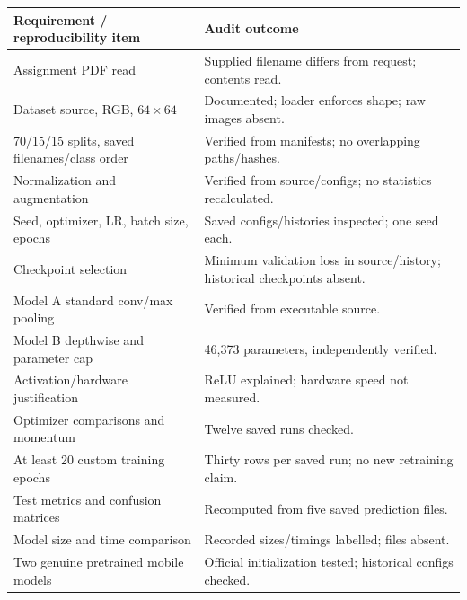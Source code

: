 \documentclass[11pt,a4paper]{article}
\begin{document}
\begin{longtable}{p{.58\linewidth}p{.34\linewidth}}\toprule

Requirement / reproducibility item & Audit outcome\\\midrule\endhead

Assignment PDF read & Supplied filename differs from request; contents read.\\

Dataset source, RGB, $64\times64$ & Documented; loader enforces shape; raw images absent.\\

70/15/15 splits, saved filenames/class order & Verified from manifests; no overlapping paths/hashes.\\

Normalization and augmentation & Verified from source/configs; no statistics recalculated.\\

Seed, optimizer, LR, batch size, epochs & Saved configs/histories inspected; one seed each.\\

Checkpoint selection & Minimum validation loss in source/history; historical checkpoints absent.\\

Model A standard conv/max pooling & Verified from executable source.\\

Model B depthwise and parameter cap & 46,373 parameters, independently verified.\\

Activation/hardware justification & ReLU explained; hardware speed not measured.\\

Optimizer comparisons and momentum & Twelve saved runs checked.\\

At least 20 custom training epochs & Thirty rows per saved run; no new retraining claim.\\

Test metrics and confusion matrices & Recomputed from five saved prediction files.\\

Model size and time comparison & Recorded sizes/timings labelled; files absent.\\

Two genuine pretrained mobile models & Official initialization tested; historical configs checked.\\


\end{longtable}
\end{document}
